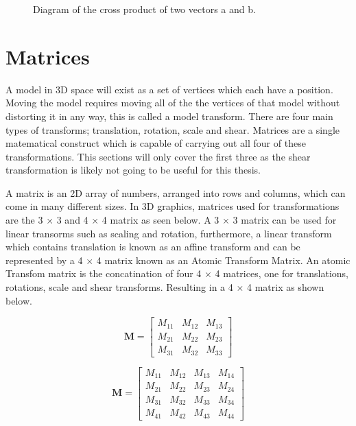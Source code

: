 \begin{figure}[htbp]
	{\centering
		\setlength{\fboxrule}{1pt}
		\vspace{7px}
		\caption{Diagram of the cross product of two vectors a and b.}
	}
\end{figure}
\FloatBarrier

\section{Matrices}

A model in 3D space will exist as a set of vertices which each have a position. Moving the model requires moving all of the the vertices of that model without distorting it in any way, this is called a model transform. There are four main types of transforms; translation, rotation, scale and shear. Matrices are a single matematical construct which is capable of carrying out all four of these transformations. This sections will only cover the first three as the shear transformation is likely not going to be useful for this thesis.    

A matrix is an 2D array of numbers, arranged into rows and columns, which can come in many different sizes. In 3D graphics, matrices used for transformations are the 3 $\times$ 3 and 4 $\times$ 4 matrix as seen below. A 3 $\times$ 3 matrix can be used for linear transorms such as scaling and rotation, furthermore, a linear transform which contains translation is known as an affine transform and can be represented by a 4 $\times$ 4 matrix known as an Atomic Transform Matrix. An atomic Transfom matrix is the concatination of four 4 $\times$ 4 matrices, one for translations, rotations, scale and shear transforms. Resulting in a 4 $\times$ 4 matrix as shown below. 

\begin{equation}
\textbf{M} = \begin{bmatrix}
M_{11} & M_{12} & M_{13} \\
M_{21} & M_{22} & M_{23} \\
M_{31} & M_{32} & M_{33}
\end{bmatrix}
\end{equation}

\begin{equation}
\textbf{M} = \begin{bmatrix}
M_{11} & M_{12} & M_{13} & M_{14}\\
M_{21} & M_{22} & M_{23} & M_{24}\\
M_{31} & M_{32} & M_{33} & M_{34}\\
M_{41} & M_{42} & M_{43} & M_{44}
\end{bmatrix}
\end{equation}

